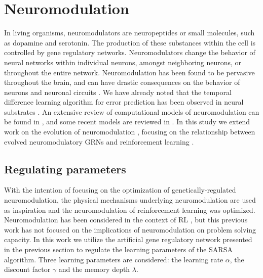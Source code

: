 \section{Neuromodulation}
In living organisms, neuromodulators are neuropeptides or small molecules, such as dopamine and
serotonin. The production of these substances within the cell is controlled by
gene regulatory networks. Neuromodulators change the behavior of neural networks
within individual neurons, amongst neighboring neurons, or throughout the entire
network. Neuromodulation has been found to be pervasive throughout the brain,
and can have drastic consequences on the behavior of neurons and neuronal
circuits \cite{Destexhe2004,Marder2012,Marder2002}. We have already noted that the temporal difference learning algorithm for error
prediction has been observed in neural substrates \cite{Schultz1993}. An
extensive review of computational models of neuromodulation can be found in
\cite{Fellous1998}, and some recent models are reviewed in \cite{Marder2012}.
In this study we extend work on the evolution of neuromodulation \cite{Soltoggio2008,Harrington2013},
focusing on the relationship between evolved neuromodulatory
GRNs and reinforcement learning \cite{Harrington2013}. 

\subsection{Regulating parameters}
With the intention of focusing on the optimization of genetically-regulated neuromodulation, the physical mechanisms underlying neuromodulation are used as inspiration and the neuromodulation of reinforcement learning was optimized. Neuromodulation has been considered in the context of RL \cite{Doya2002,Schweighofer2003,Doya2008}, but this previous work has not focused on the implications of neuromodulation on problem solving capacity. In this work we utilize the artificial gene regulatory network presented in the previous section to regulate the learning parameters of the SARSA algorithm. Three learning parameters are considered: the learning rate $\alpha$, the discount factor $\gamma$ and the memory depth $\lambda$.

